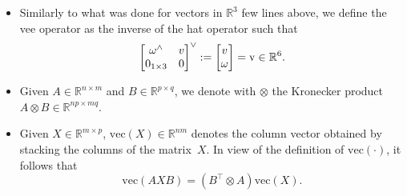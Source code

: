 \begin{itemize}
\item
Similarly to what was done for vectors in $\mathbb{R}^3$ few lines above, 
we define the vee operator as the inverse of the hat operator such that
\begin{align}
\begin{bmatrix}
  \omega^\wedge  & v \\ 
  0_{1\times3}        & 0 
\end{bmatrix}^{\vee}
:=
\begin{bmatrix}
  v \\
  \omega
\end{bmatrix}  
= {\rm v} \in \mathbb{R}^6.
\end{align}

\item Given $A \in \mathbb{R}^{n \times m}$ and $B \in \mathbb{R}^{p \times q}$, we denote with $\otimes$ the Kronecker product $A \otimes B \in \mathbb{R}^{np \times mq}$.
\item Given $X \in \mathbb{R}^{m \times p}$, $\text{vec}(X) \in \mathbb{R}^{nm}$ denotes the column vector obtained by stacking the columns of the matrix~$X$. 
In view of the definition of $\text{vec}(\cdot)$, it follows that \begin{equation}\label{eq:kroneckerVec} \text{vec}(AXB) = \left( B^{\top} \otimes A \right) \text{vec}(X).\end{equation}

\end{itemize}
